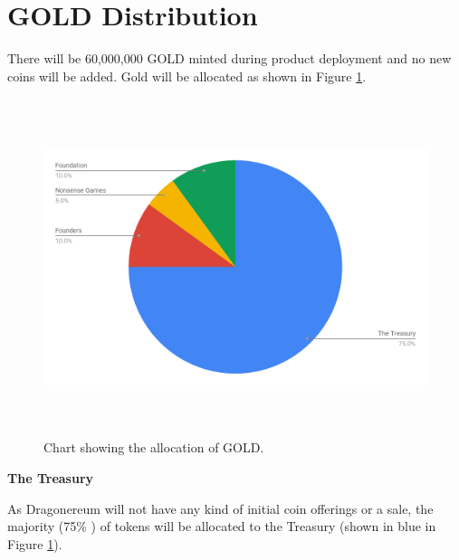 \documentclass[12pt]{article}
\begin{document}

\newpage

\vspace{\baselineskip}\section{GOLD Distribution}
\label{GOLD Distribution} \par

There will be 60,000,000 GOLD minted during product deployment and no new coins will be added. Gold will be allocated as shown in Figure \ref{fig:Chart_showing_the_allocation_of_GOLD}.\par




\begin{figure}[H]
	\begin{FlushLeft}		\includegraphics[width=6.27in,height=3.88in]{./media/image26.png}
		\caption{Chart showing the allocation of GOLD.}
		\label{fig:Chart_showing_the_allocation_of_GOLD}
	\end{FlushLeft}\end{figure}




\textbf{The Treasury}\par

As Dragonereum will not have any kind of initial coin offerings or a sale, the majority (75$\%$ ) of tokens will be allocated to the Treasury (shown in blue in Figure \ref{fig:Chart_showing_the_allocation_of_GOLD}).\par
\end{document}

